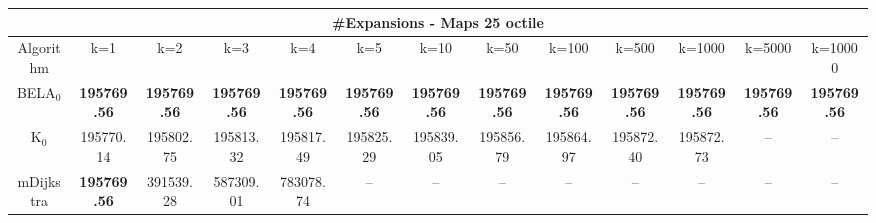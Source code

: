 \begin{tabular}{c|cccccccccccc}\toprule
\multicolumn{13}{c}{#Expansions - Maps 25 octile}\\ \midrule
Algorithm & k=1 & k=2 & k=3 & k=4 & k=5 & k=10 & k=50 & k=100 & k=500 & k=1000 & k=5000 & k=10000 \\ \midrule
BELA$_0$ & \textbf{195769.56} & \textbf{195769.56} & \textbf{195769.56} & \textbf{195769.56} & \textbf{195769.56} & \textbf{195769.56} & \textbf{195769.56} & \textbf{195769.56} & \textbf{195769.56} & \textbf{195769.56} & \textbf{195769.56} & \textbf{195769.56} \\
K$_0$ & 195770.14 & 195802.75 & 195813.32 & 195817.49 & 195825.29 & 195839.05 & 195856.79 & 195864.97 & 195872.40 & 195872.73 & -- & -- \\
mDijkstra & \textbf{195769.56} & 391539.28 & 587309.01 & 783078.74 & -- & -- & -- & -- & -- & -- & -- & -- \\ \bottomrule 
\end{tabular}
